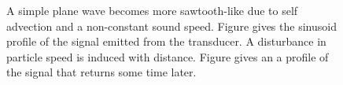 












 \begin{figure}
         \hfill
      \caption{A simple plane wave becomes more sawtooth-like due to self advection and a non-constant sound speed.  
Figure  gives the sinusoid profile of the signal emitted from the transducer.
A disturbance in particle speed is induced with distance.
Figure  gives an a profile of the signal that returns some time later.
 }
      \label{fig:nonLinear}
 \end{figure}

